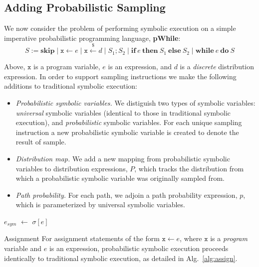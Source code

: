 \documentclass[acmsmall,review]{acmart}\settopmatter{}
\newcommand*\Let[2]{\State #1 $\gets$ #2}
\begin{document}
	\subsection{Adding Probabilistic Sampling}
	We now consider the problem of performing symbolic execution on a simple imperative probabilistic programming language, \textbf{pWhile}:
	\[
	S := \mathbf{skip} \mid \mathtt{x} \leftarrow e \mid \mathtt{x} \xleftarrow{\$} d \mid S_1 ; S_2 \mid \mathbf{if}~e~\mathbf{then}~S_1~\mathbf{else}~S_2 \mid \mathbf{while}~e~\mathbf{do}~S 
	\]
	
	Above, $\mathtt{x}$ is a program variable, $e$ is an expression, and $d$ is a \textit{discrete} distribution expression. 
	In order to support sampling instructions we make the following additions to traditional symbolic execution:
	\begin{itemize}
		\item \textit{Probabilistic symbolic variables.} We distiguish two types of symbolic variables: \textit{universal} symbolic variables (identical to those in traditional symbolic execution), and \textit{probabilistic} symbolic variables.
		For each unique sampling instruction a new probabilistic symbolic variable is created to denote the result of sample.
		\item \textit{Distribution map.} We add a new mapping from probabilistic symbolic variables to distribution expressions, $P$, which tracks the distribution from which a probabilistic symbolic variable was originally sampled from.
		\item \textit{Path probability.} For each path, we adjoin a path probability expression, $p$, which is parameterized by universal symbolic variables.
	\end{itemize}
	
	\begin{algorithm}[H]
		\caption{PSE Assignment Algorithm}
		\label{alg:assign}
		\begin{algorithmic}[1]
			\Let{$e_{sym}$}{$\sigma[e]$}
			\State{$\sigma[\mathtt{x}] = e_{sym}$}
			\State{}
			\EndFunction
		\end{algorithmic}
	\end{algorithm}
	
	\begin{paragraph}{Assignment}
		For assignment statements of the form $\mathtt{x} \leftarrow e$, where $\mathtt{x}$ is a \textit{program} variable and $e$ is an expression, probabilistic symbolic execution proceeds identically to traditional symbolic execution, as detailed in Alg.~\ref{alg:assign}.
	\end{paragraph}
	
\end{document}
